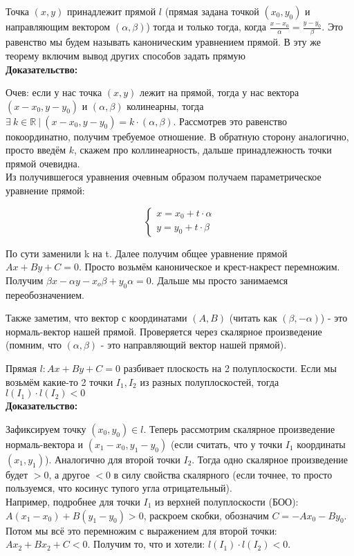 \documentclass[12pt]{article}
\newcommand{\R}{\mathbb{R}}
\begin{document}
\begin{theorembox}
Точка $(x, y)$ принадлежит прямой $l$ (прямая задана точкой $(x_0, y_0)$ и направляющим вектором $(\alpha, \beta)$) тогда и только тогда, когда $\frac{x - x_0}{\alpha} = \frac{y - y_0}{\beta}$. Это равенство мы будем называть каноническим уравнением прямой. В эту же теорему включим вывод других способов задать прямую\\

\textbf{Доказательство:}

Очев: если у нас точка $(x, y)$ лежит на прямой, тогда у нас вектора $(x - x_0, y - y_0)$ и $(\alpha, \beta)$ колинеарны, тогда $\exists \ k \in \R \ | \ (x - x_0, y - y_0) = k \cdot (\alpha, \beta)$. Рассмотрев это равенство покоординатно, получим требуемое отношение. В обратную сторону аналогично, просто введём $k$, скажем про коллинеарность, дальше принадлежность точки прямой очевидна.\\

Из получившегося уравнения очевным образом получаем параметрическое уравнение прямой:

\[
\begin{cases}
x = x_0 + t \cdot \alpha \\
y = y_0 + t \cdot \beta
\end{cases}
\]

По сути заменили k на t. Далее получим общее уравнение прямой $Ax + By +C = 0$. Просто возьмём каноническое и крест-накрест перемножим. Получим $\beta x - \alpha y - x_o \beta + y_0 \alpha = 0$. Дальше мы просто занимаемся переобозначением.
\end{theorembox}

\begin{remarkbox}
    Также заметим, что вектор с координатами $(A, B)$ (читать как $(\beta, -\alpha)$) - это нормаль-вектор нашей прямой. Проверяется через скалярное произведение (помним, что $(\alpha, \beta)$ - это направляющий вектор нашей прямой).
\end{remarkbox}

\begin{theorembox}
Прямая $l: Ax +By + C = 0$ разбивает плоскость на 2 полуплоскости. Если мы возьмём какие-то 2 точки $I_1, I_2$ из разных полуплоскостей, тогда $l(I_1) \cdot l(I_2) < 0$\\

\textbf{Доказательство:}

Зафиксируем точку $(x_0, y_0) \in l$. Теперь рассмотрим скалярное произведение нормаль-вектора и $(x_1 - x_0, y_1 - y_0)$ (если считать, что у точки $I_1$ координаты $(x_1, y_1)$). Аналогично для второй точки $I_2$. Тогда одно скалярное произведение будет $>0$, а другое $<0$ в силу свойства скалярного (если точнее, то просто пользуемся, что косинус тупого угла отрицательный).\\
Например, подробнее для точки $I_1$ из верхней полуплоскости (БОО): $A(x_1 - x_0) + B(y_1 - y_0) > 0$, раскроем скобки, обозначим $C = -Ax_0 - By_0$. Потом мы всё это перемножим с выражением для второй точки: $Ax_2 + Bx_2 + C < 0$. Получим то, что и хотели: $l(I_1) \cdot l(I_2) < 0$.

\end{theorembox}
\end{document}
